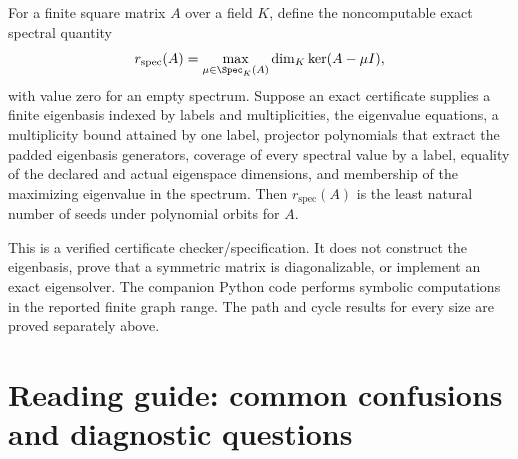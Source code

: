 \begin{construction}
\label{con:exact-graph-seed-rank}
For a finite square matrix $A$ over a field $K$, define the noncomputable exact
spectral quantity
\[
r_{\mathrm{spec}}(A)
=
\max_{\mu\in\Spec_K(A)}
\dim_K\ker(A-\mu I),
\]
with value zero for an empty spectrum.  Suppose an exact certificate supplies
a finite eigenbasis indexed by labels and multiplicities, the eigenvalue
equations, a multiplicity bound attained by one label, projector polynomials
that extract the padded eigenbasis generators, coverage of every spectral
value by a label, equality of the declared and actual eigenspace dimensions,
and membership of the maximizing eigenvalue in the spectrum.  Then
$r_{\mathrm{spec}}(A)$ is the least natural number of seeds under polynomial orbits
for $A$.

This is a verified certificate checker/specification.  It does not construct
the eigenbasis, prove that a symmetric matrix is diagonalizable, or implement
an exact eigensolver.  The companion Python code performs symbolic
computations in the reported finite graph range. The path and cycle
results for every size are proved separately above.
\end{construction}


\section{Reading guide: common confusions and diagnostic questions}

